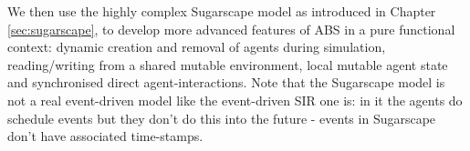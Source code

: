 We then use the highly complex Sugarscape model as introduced in Chapter \ref{sec:sugarscape}, to develop more advanced features of ABS in a pure functional context: dynamic creation and removal of agents during simulation, reading/writing from a shared mutable environment, local mutable agent state and synchronised direct agent-interactions. 
Note that the Sugarscape model is not a real event-driven model like the event-driven SIR one is: in it the agents do schedule events but they don't do this into the future - events in Sugarscape don't have associated time-stamps.





